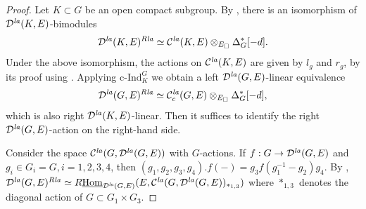 \documentclass[a4paper,10pt]{amsart}
\theoremstyle{remark}
\theoremstyle{definition}
\theoremstyle{plain}
\numberwithin{equation}{section}
\newcommand{\calC}{{\mathcal C}}
\newcommand{\calD}{{\mathcal D}}
\newcommand{\Hom}{{\rm Hom}}
\newcommand{\uHom}{\underline{\Hom}}
\newcommand{\la}{{\it la}}
\newcommand{\cInd}{\mathrm{c\text{-}Ind}}
\begin{document}
\begin{proof}
Let $K\subset G$ be an open compact subgroup. By \cite[Cor.~3.2.15]{JC23}, there is an isomorphism of $\calD^{\la}(K,E)$-bimodules
	\[
	 \calD^{\la}(K,E)^{R\la} \simeq \calC^{\la}(K,E)\otimes_{E_\square}\Delta_G^*[-d].
	\]
	Under the above isomorphism, the actions on $\calC^{\la}(K,E)$ are given by $l_g$ and $r_g$, by its proof using \cite[Cor.~3.2.14 \& Prop.~A.2.1(3)]{JC23}. Applying $\cInd_K^G$ we obtain a left $\calD^{\la}(G,E)$-linear equivalence
	\begin{equation}\label{equationDlaGRla1}
		\calD^{\la}(G,E)^{R\la}
	 \simeq \calC_c^{\la}(G,E)\otimes_{E_\square}\Delta_G^*[-d],	
	\end{equation}
	which is also right $\calD^{\la}(K,E)$-linear. Then it suffices to identify the right $\calD^{\la}(G,E)$-action on the right-hand side. 

	Consider the space $\calC^{\la}(G,\calD^{\la}(G,E))$ with $G$-actions. If $f: G\to \calD^{\la}(G,E)$ and $g_i\in G_i=G, i=1,2,3,4$, then $(g_1,g_2,g_3,g_4).f(-)=g_3f(g_1^{-1}-g_2)g_4$.  By \cite[Def.~3.2.3(3)]{JC23}, $\calD^{\la}(G,E)^{R\la}\simeq R\uHom_{\calD^{\la}(G,E)}(E, \calC^{\la}(G,\calD^{\la}(G,E))_{*_{1,3}})$ where $*_{1,3}$ denotes the diagonal action of $G\subset G_1\times G_3$. 


\end{proof}
\end{document}
